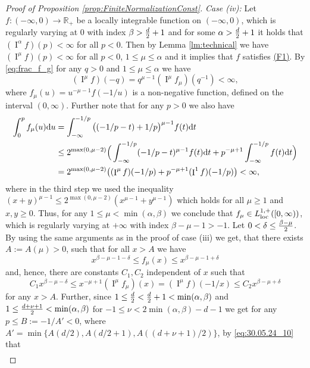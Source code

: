 \documentclass[11pt,a4paper]{article}
\theoremstyle{plain}
\theoremstyle{definition}
\theoremstyle{remark}
\def\RR{\mathbb{R}}
\newcommand{\dd}{{\rm d}}
\newcommand{\frI}{\mathop{\mathrm{I}}\nolimits}
\begin{document}
\begin{proof}[Proof of Proposition \ref{prop:FiniteNormalizationConst}]
    \textit{Case (iv):} Let $f\colon(-\infty,0)\to \RR_+$ be a locally integrable function on $(-\infty,0)$, which is regularly varying at $0$ with index $\beta>{d\over 2}+1$ and for some $\alpha> {d\over 2}+1$ it holds that $(\frI^{\alpha}f)(p)<\infty$ for all $p<0$. Then by Lemma \ref{lm:technical} we have $(\frI^{\mu}f)(p)<\infty$ for all $p<0$, $1\leq\mu\leq \alpha$ and it implies that $f$ satisfies \hyperref[item:F1]{(F1)}.  By \eqref{eq:frac_f_g} for any $q>0$ and $1\leq \mu\leq \alpha$ we have
    \[
        (\frI^{\mu}f)(-q)=q^{\mu-1}(\frI^\mu f_\mu)\left(q^{-1}\right)<\infty,   
    \]
    where $f_{\mu}(u)=u^{-\mu-1}f(-1/u)$ is a non-negative function, defined on the interval $(0,\infty)$. Further note that for any $p>0$ we also have
    \begin{align*}
        \int_{0}^pf_{\mu}(u)\dd u&=\int_{-\infty}^{-1/p}\big((-1/p-t)+1/p\big)^{\mu-1}f(t)\dd t\\
        &\leq 2^{\max(0,\mu-2)}\Big(\int_{-\infty}^{-1/p}(-1/p-t)^{\mu-1}f(t)\dd t+p^{-\mu+1}\int_{-\infty}^{-1/p}f(t)\dd t\Big)\\
        &=2^{\max(0,\mu-2)}\big((\frI^{\mu}f)(-1/p)+p^{-\mu+1}(\frI^1 f)(-1/p)\big)<\infty,
    \end{align*}
    where in the third step we used the inequality $(x+y)^{\mu-1}\leq 2^{\max(0,\mu-2)}(x^{\mu-1}+y^{\mu-1})$ which holds for all $\mu\ge 1$ and $x,y\ge 0$. Thus, for any $1\leq \mu< \min(\alpha,\beta)$ we conclude that $f_\mu\in L_{\rm loc}^{1,+}([0,\infty))$, which is regularly varying at $+\infty$ with index $\beta-\mu-1>-1$. Let $0<\delta\leq  {\beta-\mu\over 2}$. By using the same arguments as in the proof of case (iii) we get, that there exists $A:=A(\mu)>0$, such that for all $x>A$ we have 
    \[
        x^{\beta-\mu-1-\delta}\le f_\mu(x)\le x^{\beta-\mu-1+\delta}
    \]
    and, hence, there are constants $C_1,C_2$ independent of $x$ such that
    \begin{equation}\label{eq:30.05.24_10}
        C_1 x^{\beta-\mu-\delta}\leq x^{-\mu+1}(\frI^{\mu}f_{\mu})(x)=(\frI^{\mu}f)(-1/x)\leq C_2 x^{\beta-\mu+\delta}
    \end{equation}
    for any $x>A$. Further, since $1\leq {d\over 2}<{d\over 2}+1< \min(\alpha,\beta)$ and $1\leq {d+\nu+1\over 2}<\min(\alpha,\beta)$ for $-1\leq \nu<2\min(\alpha,\beta)-d-1$ 
    we get for any $p\leq B:=-1/A'<0$, where $A'=\min\{A(d/2), A(d/2+1),A((d+\nu+1)/2)\}$, by \eqref{eq:30.05.24_10} that
    \begin{equation}\label{eq:12.04.24_1}
        \begin{aligned}

\end{aligned}
\end{equation}
\end{proof}
\end{document}
